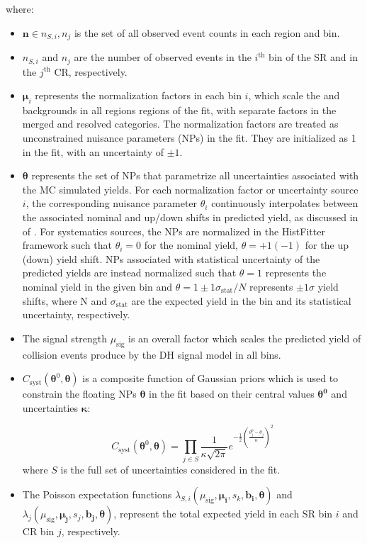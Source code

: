 where:

\begin{itemize}
    \item \(\boldsymbol{n}\in{n_{S,i}, n_j}\) is the set of all observed event counts in each region and bin.
    \item \(n_{S,i}\) and \(n_j\) are the number of observed events in the \(i^\text{th}\) bin of the SR and in the \(j^\text{th}\) CR, respectively.
    \item \(\boldsymbol{\mu}_i\) represents the normalization factors in each bin \(i\), which scale the \wjets and \ttbar backgrounds in all regions regions of the fit, with separate factors in the merged and resolved categories. The normalization factors are treated as unconstrained nuisance parameters (NPs) in the fit. They are initialized as 1 in the fit, with an uncertainty of \(\pm1\).  
    \item \(\boldsymbol{\theta}\) represents the set of NPs that parametrize all uncertainties associated with the MC simulated yields. For each normalization factor or uncertainty source \(i\), the corresponding nuisance parameter \(\theta_i\) continuously interpolates between the associated nominal and up/down shifts in predicted yield, as discussed in  of . For systematics sources, the NPs are normalized in the HistFitter framework such that \(\theta_i=0\) for the nominal yield, \(\theta=+1(-1)\) for the up (down) yield shift. NPs associated with statistical uncertainty of the predicted yields are instead normalized such that \(\theta=1\) represents the nominal yield in the given bin and \(\theta=1\pm1\sigma_\text{stat}/N\) represents \(\pm1\sigma\) yield shifts, where N and \(\sigma_\text{stat}\) are the expected yield in the bin and its statistical uncertainty, respectively. 
    \item The signal strength \(\mu_\text{sig}\) is an overall factor which scales the predicted yield of collision events produce by the DH signal model in all bins.
    \item \(C_\text{syst}(\boldsymbol{\theta}^0, \boldsymbol{\theta})\) is a composite function of Gaussian priors which is used to constrain the floating NPs \(\boldsymbol{\theta}\) in the fit based on their central values \(\boldsymbol{\theta^0}\) and uncertainties \(\boldsymbol{\kappa}\):

    \begin{equation}
    \label{eq:gaussian_np}
    C_\text{syst}(\boldsymbol{\theta}^0, \boldsymbol{\theta})= \prod_{j\in S} \frac{1}{\kappa\sqrt{2\pi}}e^{-\frac{1}{2}(\frac{\theta^0_j-\theta_j}{\kappa})^2}
    \end{equation}
    \noindent where \(S\) is the full set of uncertainties considered in the fit.
    
    \item The Poisson expectation functions \(\lambda_{S,i}(\mu_\text{sig}, \boldsymbol{\mu_i}, s_k, \boldsymbol{b_i}, \boldsymbol{\theta})\) and \(\lambda_j(\mu_\text{sig}, \boldsymbol{\mu_j}, s_j, \boldsymbol{b_j}, \boldsymbol{\theta})\), represent the total expected yield in each SR bin \(i\) and CR bin \(j\), respectively. 
\end{itemize}

